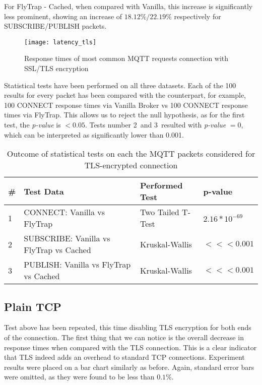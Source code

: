 For FlyTrap - Cached, when compared with Vanilla, this increase is significantly less prominent, showing an increase of $18.12\%/22.19\%$ respectively for SUBSCRIBE/PUBLISH packets. 
\begin{figure}[h]
    \centering
    \texttt{[image: latency\_tls]}
    \caption{Response times of most common MQTT requests connection with SSL/TLS encryption}
    \label{fig:latency_tls}
\end{figure}

Statistical tests have been performed on all three datasets. Each of the 100 results for every packet has been compared with the counterpart, for example, 100 CONNECT response times via Vanilla Broker vs 100 CONNECT response times via FlyTrap. This allows us to reject the null hypothesis, as for the first test, the \textit{p-value} is $<0.05$. Tests number 2\ and 3\ resulted with \textit{p-value} $=0$, which can be interpreted as significantly lower than 0.001.

\begin{table}[h]
\centering
\begin{tabular}{|l|l|l|l|}
\hline
\textbf{\#} & \textbf{Test Data}                       & \textbf{Performed Test} & \textbf{p-value}                      \\ \hline
1           & CONNECT: Vanilla vs FlyTrap              & Two Tailed T-Test       & $2.16*10^{-69}$                    \\ \hline
2           & SUBSCRIBE: Vanilla vs FlyTrap vs Cached & Kruskal-Wallis          & $<<< 0.001$ \\ \hline
3           & PUBLISH: Vanilla vs FlyTrap vs Cached & Kruskal-Wallis          & $<<< 0.001$ \\ \hline
\end{tabular}
\caption{Outcome of statistical tests on each the MQTT packets considered for TLS-encrypted connection}
\label{tab:ttest-tls}
\end{table}
\subsection{Plain TCP}

Test above has been repeated, this time disabling TLS encryption for both ends of the connection. The first thing that we can notice is the overall decrease in response times when compared with the TLS connection. This is a clear indicator that TLS indeed adds an overhead to standard TCP connections. Experiment results were placed on a bar chart similarly as before. Again, standard error bars were omitted, as they were found to be less than $0.1\%$.

